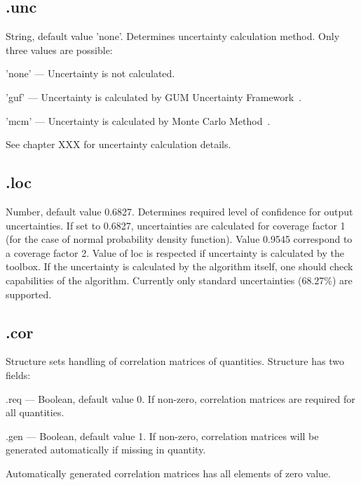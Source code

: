 \documentclass[12pt,a4paper,oneside]{report} %
\begin{document}
\subsection{\textsf{.unc}} %
\label{structcalcsetunc}
String, default value 'none'. Determines uncertainty calculation method. Only three values are possible:
\begin{tightdesc}
        \item [\textsf{'none'}] ---  Uncertainty is not calculated.
        \item [\textsf{'guf'}] ---  Uncertainty is calculated by GUM Uncertainty Framework~\cite{JCGM1995}.
        \item [\textsf{'mcm'}] ---  Uncertainty is calculated by Monte Carlo Method~\cite{JCGM2008}.
\end{tightdesc}
See chapter XXX %
for uncertainty calculation details.

\subsection{\textsf{.loc}} %
\label{structcalcsetloc}
Number, default value 0.6827. Determines required level of confidence for output uncertainties. If
set to 0.6827, uncertainties are calculated for coverage factor 1 (for the case of normal probability
density function). Value 0.9545 correspond to a coverage factor 2. Value of loc is respected if
uncertainty is calculated by the toolbox. If the uncertainty is calculated by the algorithm itself,
one should check capabilities of the algorithm. Currently only standard uncertainties (68.27\%) are
supported. %

\subsection{\textsf{.cor}} %
\label{structcalcsetcor}
Structure sets handling of correlation matrices of quantities. Structure has two fields:
\begin{tightdesc}
        \item [\textsf{.req}] ---  Boolean, default value 0. If non-zero, correlation matrices are required for all quantities.
        \item [\textsf{.gen}] ---  Boolean, default value 1. If non-zero, correlation matrices will be generated
        automatically if missing in quantity.
\end{tightdesc}
Automatically generated correlation matrices has all elements of zero value.
\end{document}
